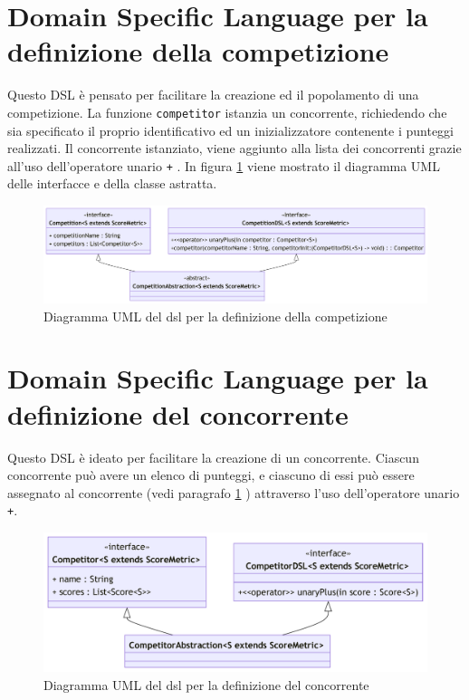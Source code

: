 \documentclass[12pt,a4paper,openright,twoside]{book}
\begin{document}
\section{Domain Specific Language per la definizione della competizione}
\label{dslcompetizione}
Questo DSL è pensato per facilitare la creazione ed il popolamento di una competizione.
La funzione \texttt{competitor} istanzia un concorrente,
richiedendo che sia specificato il proprio identificativo ed un inizializzatore contenente i punteggi realizzati.
Il concorrente istanziato, viene aggiunto alla lista dei concorrenti grazie all'uso dell'operatore unario \texttt{+} .
In figura \ref{fig:competitionDSL} viene mostrato il diagramma UML delle interfacce e della classe astratta.
\begin{figure}[H]
    \centering
     \includegraphics[width=1.1\linewidth]{figures/competitionDSL.pdf}
     \caption{Diagramma UML del \ac{dsl} per la definizione della competizione}
    \label{fig:competitionDSL}
 \end{figure}
 \newpage

\section{Domain Specific Language per la definizione del concorrente}
Questo DSL è ideato per facilitare la creazione di un concorrente.
Ciascun concorrente può avere un elenco di punteggi, e ciascuno di essi può essere
assegnato al concorrente (vedi paragrafo \ref{dslcompetizione} ) attraverso l'uso dell'operatore unario \texttt{+}.
\begin{figure}[H]
    \centering
     \includegraphics[width=1.1\linewidth]{figures/competitorDSL.pdf}
     \caption{Diagramma UML del \ac{dsl} per la definizione del concorrente}
    \label{fig:competitorDSL}
 \end{figure}
 \newpage
\end{document}
